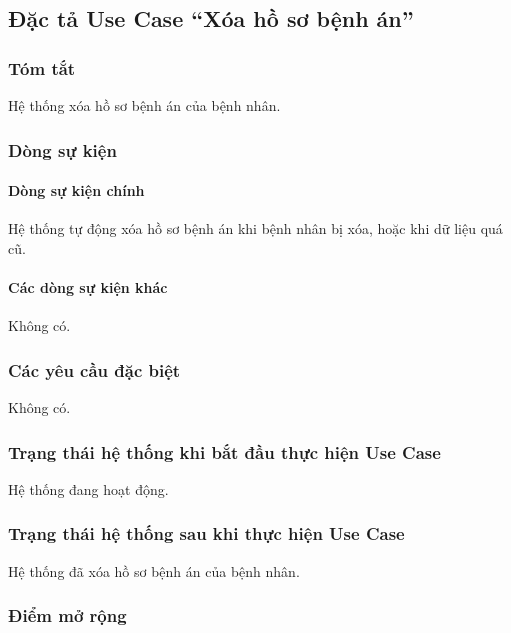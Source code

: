 \subsection{Đặc tả Use Case ``Xóa hồ sơ bệnh án''}

\subsubsection{Tóm tắt}
Hệ thống xóa hồ sơ bệnh án của bệnh nhân.

\subsubsection{Dòng sự kiện}
\paragraph{\textbf{Dòng sự kiện chính}}
Hệ thống tự động xóa hồ sơ bệnh án khi bệnh nhân bị xóa, hoặc khi dữ liệu quá cũ.

\paragraph{\textbf{Các dòng sự kiện khác}}
Không có.

\subsubsection{Các yêu cầu đặc biệt}
Không có.

\subsubsection{Trạng thái hệ thống khi bắt đầu thực hiện Use Case}
Hệ thống đang hoạt động.

\subsubsection{Trạng thái hệ thống sau khi thực hiện Use Case}
Hệ thống đã xóa hồ sơ bệnh án của bệnh nhân.

\subsubsection{Điểm mở rộng}